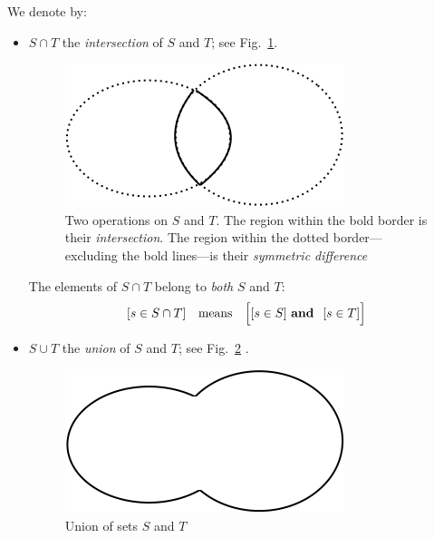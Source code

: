 \bigskip

\noindent
We denote by:
\begin{itemize}
\item
$S \cap T$ the {\it intersection} of $S$ and $T$; see Fig.~\ref{fig:setIntersection}.
\begin{figure}[htb]
\begin{center}
        \includegraphics[scale=0.4]{FiguresMaths/setIntersection}
        \caption{Two operations on $S$ and $T$. The region within the bold border is their {\em intersection}. The region within the dotted border---excluding the bold lines---is their {\em symmetric difference}}
        \label{fig:setIntersection}
\end{center}
\end{figure}

\smallskip

The elements of $S \cap T$ belong to {\em both} $S$ and $T$:
\[ [s \in S \cap T] \ \ \mbox{ means } \ \ 
\Big[ [s \in S] \ \mbox{\bf and } \ [s \in T] \Big]
\]

\medskip\item
$S \cup T$ the {\it union} of $S$ and $T$; see Fig.~\ref{fig:setUnion} .
\begin{figure}[htb]
\begin{center}
        \includegraphics[scale=0.4]{FiguresMaths/setUnion}
        \caption{Union of sets $S$ and $T$}
        \label{fig:setUnion}
\end{center}
\end{figure}

\smallskip


\end{itemize}
